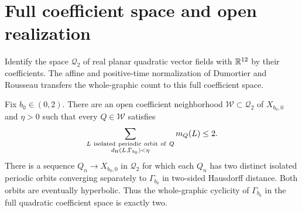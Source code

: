 \section{Full coefficient space and open realization}
\label{sec:quadratic-transfer}
Identify the space $\mathcal Q_2$ of real planar quadratic vector
fields with $\mathbb R^{12}$ by their coefficients. The affine and positive-time
normalization of Dumortier and Rousseau transfers the whole-graphic
count to this full coefficient space.

\begin{corollary}\label{cor:quadratic-space}
Fix $b_0\in(0,2)$. There are an open coefficient neighborhood
$\mathcal W\subset\mathcal Q_2$ of $X_{b_0,0}$ and $\eta>0$ such
that every $Q\in\mathcal W$ satisfies
\[
 \sum_{\substack{L\ {\rm isolated\ periodic\ orbit\ of}\ Q\\
                    d_{\rm H}(L,\Gamma_{b_0})<\eta}}m_Q(L)\le2.
\]
There is a sequence $Q_n\to X_{b_0,0}$ in $\mathcal Q_2$ for which
each $Q_n$ has two distinct isolated periodic orbits converging
separately to $\Gamma_{b_0}$ in two-sided Hausdorff distance.
Both orbits are eventually hyperbolic. Thus the whole-graphic
cyclicity of $\Gamma_{b_0}$ in the full quadratic coefficient space
is exactly two.
\end{corollary}

